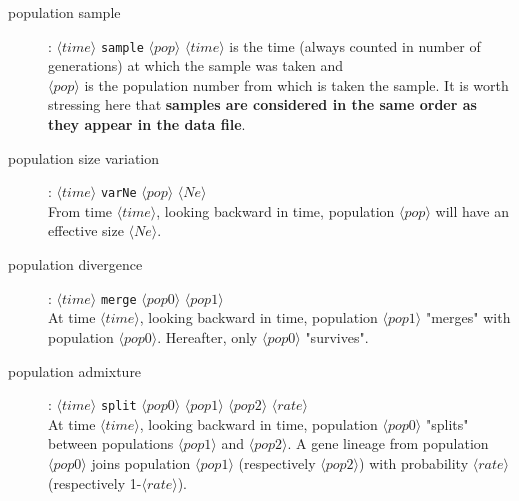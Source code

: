 \begin{description}
\item [{population sample}] : $\langle time\rangle$ \texttt{sample} $\langle pop\rangle$
$\langle time\rangle$ is the time (always counted in number of generations)
at which the sample was taken and\\
 $\langle pop\rangle$ is the population number from which is taken
the sample. It is worth stressing here that \textbf{samples are considered
in the same order as they appear in the data file}.\\

\item [{population size variation}] : $\langle time\rangle$ \texttt{varNe}
$\langle pop\rangle$ $\langle Ne\rangle$\\
 From time $\langle time\rangle$, looking backward in time, population
$\langle pop\rangle$ will have an effective size $\langle Ne\rangle$.
\item [{population divergence}] : $\langle time\rangle$ \texttt{merge}
$\langle pop0\rangle$ $\langle pop1\rangle$\\
 At time $\langle time\rangle$, looking backward in time, population
$\langle pop1\rangle$ "merges" with population
$\langle pop0\rangle$. Hereafter, only $\langle pop0\rangle$ "survives".
\item [{population admixture}] : $\langle time\rangle$ \texttt{split}
$\langle pop0\rangle$ $\langle pop1\rangle$ $\langle pop2\rangle$
$\langle rate\rangle$\\
 At time $\langle time\rangle$, looking backward in time, population
$\langle pop0\rangle$ "splits" between
populations $\langle pop1\rangle$ and $\langle pop2\rangle$. A gene
lineage from population $\langle pop0\rangle$ joins population $\langle pop1\rangle$
(respectively $\langle pop2\rangle$) with probability $\langle rate\rangle$
(respectively 1-$\langle rate\rangle$).
\end{description}
